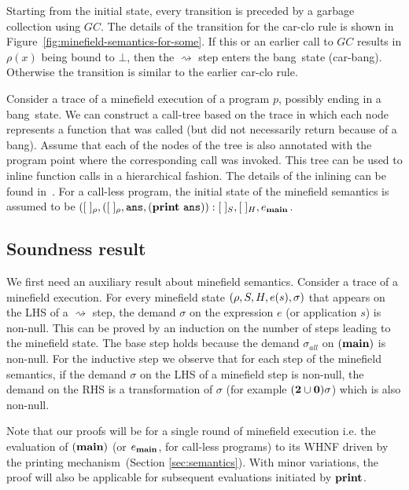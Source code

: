 \documentclass[9pt]{sigplanconf}
\newcommand{\bang}{\mbox{\sc bang}}
\begin{document}
Starting from the initial state,
every transition  is preceded  by a  garbage collection
using $GC$.  The details of the transition for the {\sc
  car-clo}  rule   is  shown   in
Figure~\ref{fig:minefield-semantics-for-some}.  If  this  or  an
earlier  call to  $GC$  results  in $\rho(x)$  being
bound  to  $\bot$,  then  the  $\rightsquigarrow$  step
enters the  \bang\ state ({\sc  car-bang}). Otherwise
the transition is similar to the earlier {\sc car-clo}
rule. 



Consider a trace  of a minefield execution of a  program $p$, possibly
ending in  a \bang\ state. We  can construct a call-tree  based on the
trace in  which each node represents  a function that was  called (but
did not necessarily  return because of a \bang).  Assume  that each of
the nodes of  the tree is also annotated with  the program point where
the corresponding call  was invoked.  This tree can be  used to inline
function calls in a hierarchical fashion.  The details of the inlining
can be found in~\cite{asati14lgc}.
For  a
call-less program,  the initial state of  the minefield
semantics  is  assumed  to  be  $([\;]_\rho,([\;]_\rho,
\mathbf{\mbox{\tt ans}},      (\mathbf{print}~\mathbf{\mbox{\tt ans}})):[\;]_{S}     ,      [\;]_{H},
e_{\mathbf{main}}$.
   
 
\subsection{Soundness result}
We first need an auxiliary  result about minefield semantics. Consider
a trace of  a minefield execution.  For every  minefield state $(\rho,
S,   H,  e(s),   \sigma)$   that   appears  on   the   LHS  of   a
$\rightsquigarrow$ step, the demand $\sigma$ on the expression $e$ (or
application $s$) is  non-null.  This can be proved by  an induction on
the number  of steps leading  to the  minefield state.  The  base step
holds   because  the   demand   $\sigma_{\mathit{all}}$   on  $(\mathbf{main})$   is
non-null. For the inductive step we  observe that for each step of the
minefield semantics, if the demand $\sigma$  on the LHS of a minefield
step  is non-null,  the  demand  on the  RHS  is  a transformation  of
$\sigma$ (for example $({\mathbf{2}}\cup\mathbf{0})\sigma$) which is also non-null.

Note that our proofs will be for a single round of minefield execution
i.e.  the evaluation of $(\mathbf{main})$ (or $e_{\mathbf{main}}$, for call-less
programs)  to   its  WHNF  driven  by   the  printing  mechanism~(Section
\ref{sec:semantics}).  With  minor variations,  the proof will  also be
applicable for subsequent evaluations initiated by $\mathbf{print}$.
\end{document}
